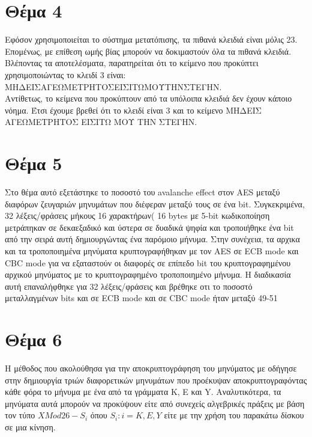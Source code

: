 \documentclass[a4paper, 11pt]{article}
\newcommand{\lt}{\latintext}
\begin{document}
\newpage


\section*{Θέμα 4}
Εφόσον χρησιμοποιείται το σύστημα μετατόπισης, τα πιθανά κλειδιά είναι μόλις 23. Επομένως, με επίθεση ωμής βίας μπορούν να
δοκιμαστούν όλα τα πιθανά κλειδιά. Βλέποντας τα αποτελέσματα, παρατηρείται ότι το κείμενο που προκύπτει χρησιμοποιώντας το κλειδί 3 είναι:\\
ΜΗΔΕΙΣΑΓΕΩΜΕΤΡΗΤΟΣΕΙΣΙΤΩΜΟΥΤΗΝΣΤΕΓΗΝ.\\
Αντίθετως, το κείμενα που προκύπτουν από τα υπόλοιπα κλειδιά δεν έχουν κάποιο νόημα. Έτσι έχουμε βρεθεί ότι
το κλειδί είναι 3 και το κείμενο ΜΗΔΕΙΣ ΑΓΕΩΜΕΤΡΗΤΟΣ ΕΙΣΙΤΩ ΜΟΥ ΤΗΝ ΣΤΕΓΗΝ.









\newpage


\section*{Θέμα 5}
Στο θέμα αυτό εξετάστηκε το ποσοστό του {\lt avalanche effect} στον {\lt AES} μεταξύ διαφόρων ζευγαριών μηνυμάτων που διέφεραν μεταξύ τους σε ένα {\lt bit}.
Συγκεκριμένα, 32 λέξεις/φράσεις μήκους 16 χαρακτήρων( 16 {\lt bytes} με 5-{\lt bit} κωδικοποίηση μετράπηκαν σε δεκαεξαδικό και ύστερα σε δυαδικά ψηφία
και τροποιήθηκε ένα {\lt bit} από την σειρά αυτή δημιουργώντας ένα παρόμοιο μήνυμα.
Στην συνέχεια, τα αρχικα και τα τροποποιημένα μηνύματα κρυπτογραφήθηκαν με τον {\lt AES} σε {\lt ECB mode} και {\lt CBC mode} για να εξαταστούν
οι διαφορές σε επίπεδο {\lt bit} του κρυπτογραφημένου αρχικού μηνύματος με το κρυπτογραφημένο τροποποιημένο μήνυμα.
Η διαδικασία αυτή επαναλήφθηκε για 32 λέξεις/φράσεις και βρέθηκε οτι το ποσοστό μεταλλαγμένων bits και σε {\lt ECB mode} και σε {\lt CBC mode} ήταν μεταξύ 49-51%




\newpage
\section*{Θέμα 6}

Η μέθοδος που ακολούθησα για την αποκρυπτογράφηση του μηνύματος με οδήγησε στην δημιουργία τριών διαφορετικών μηνυμάτων που προέκυψαν αποκρυπτογραφόντας κάθε φόρα το μήνυμα με ένα από τα γράμματα {\lt K}, {\lt E} και {\lt Y}.
Αναλυτικότερα, τα μηνύματα αυτά μπορούν να προκύψουν είτε από συνεχείς αλγεβρικές πράξεις με βάση τον τύπο $ X  Μod 26 - S_{i} $ όπου $S_{i} : i = {K, E, Y} $ είτε με την χρήση του παρακάτω δίσκου σε μια κίνηση.
\end{document}
